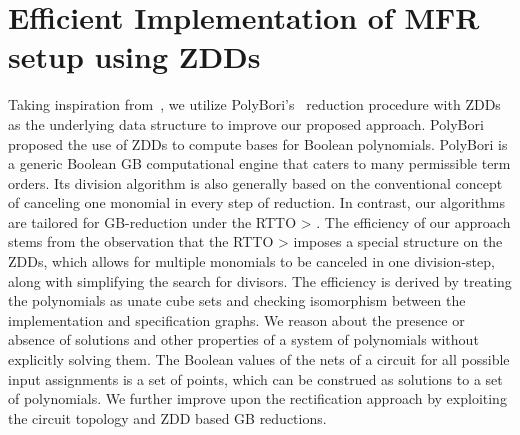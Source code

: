 \section{Efficient Implementation of MFR setup using ZDDs}\label{impl}

Taking inspiration from~\cite{Utkarsh:TCAD19}, we utilize 
PolyBori’s~\cite{pbori:JSC09} reduction procedure with 
ZDDs~\cite{Minato:DAC93,Minato:DAC94} as the underlying data structure 
to improve our proposed approach.
PolyBori proposed the use of ZDDs to compute
\Grobner bases for Boolean polynomials. PolyBori is a generic Boolean GB computational
engine that caters to many permissible term orders. Its division algorithm is also generally
based on the conventional concept of canceling one monomial in every step of reduction.
In contrast, our algorithms are tailored for GB-reduction under the RTTO > . The efficiency
of our approach stems from the observation that the RTTO > imposes a special structure
on the ZDDs, which allows for multiple monomials to be canceled in one division-step,
along with simplifying the search for divisors.
The efficiency is derived by treating the polynomials 
as unate cube sets and checking isomorphism between the implementation and specification 
graphs. We reason about the presence or absence of solutions and other properties of a 
system of polynomials without explicitly solving them. 
The Boolean values of the nets of a circuit for all possible input assignments is a set 
of points, which can be construed as solutions to a set of polynomials.
We further improve upon the rectification approach by exploiting the circuit 
topology and ZDD based GB reductions.
